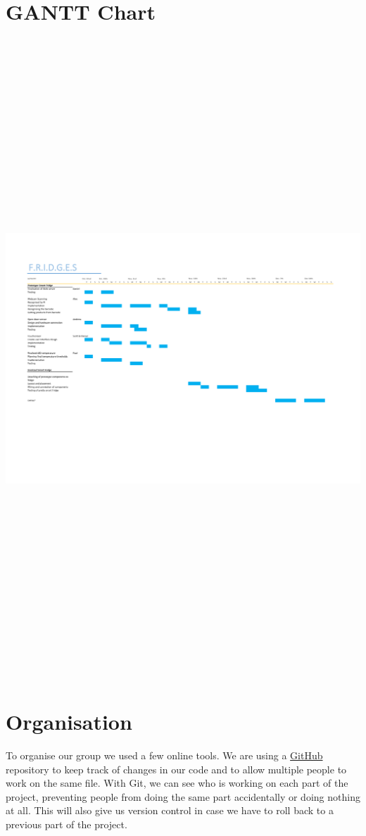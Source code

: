\documentclass[10pt]{article}
\begin{document}
\section{GANTT Chart}
\includegraphics[height=24cm, width=24cm,angle=90]{GANTT.pdf}

\newpage

\section{Organisation}
To organise our group we used a few online tools. We are using a \href{https://github.com/pmcgurk/CS413}{GitHub} repository to keep track of changes in our code and to allow multiple people to work on the same file. With Git, we can see who is working on each part of the project, preventing people from doing the same part accidentally or doing nothing at all. This will also give us version control in case we have to roll back to a previous part of the project.
\end{document}
